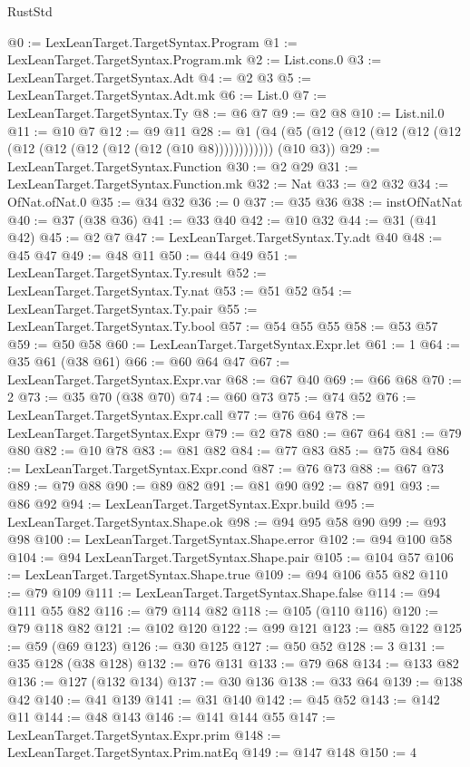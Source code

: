 \begin{lexlean}{RustStd}
\begin{coremodule}
@0 := LexLeanTarget.TargetSyntax.Program
@1 := LexLeanTarget.TargetSyntax.Program.mk
@2 := List.cons.{0}
@3 := LexLeanTarget.TargetSyntax.Adt
@4 := @2 @3
@5 := LexLeanTarget.TargetSyntax.Adt.mk
@6 := List.{0}
@7 := LexLeanTarget.TargetSyntax.Ty
@8 := @6 @7
@9 := @2 @8
@10 := List.nil.{0}
@11 := @10 @7
@12 := @9 @11
@28 := @1 (@4 (@5 (@12 (@12 (@12 (@12 (@12 (@12 (@12 (@12 (@12 (@12 (@10 @8)))))))))))) (@10 @3))
@29 := LexLeanTarget.TargetSyntax.Function
@30 := @2 @29
@31 := LexLeanTarget.TargetSyntax.Function.mk
@32 := Nat
@33 := @2 @32
@34 := OfNat.ofNat.{0}
@35 := @34 @32
@36 := 0
@37 := @35 @36
@38 := instOfNatNat
@40 := @37 (@38 @36)
@41 := @33 @40
@42 := @10 @32
@44 := @31 (@41 @42)
@45 := @2 @7
@47 := LexLeanTarget.TargetSyntax.Ty.adt @40
@48 := @45 @47
@49 := @48 @11
@50 := @44 @49
@51 := LexLeanTarget.TargetSyntax.Ty.result
@52 := LexLeanTarget.TargetSyntax.Ty.nat
@53 := @51 @52
@54 := LexLeanTarget.TargetSyntax.Ty.pair
@55 := LexLeanTarget.TargetSyntax.Ty.bool
@57 := @54 @55 @55
@58 := @53 @57
@59 := @50 @58
@60 := LexLeanTarget.TargetSyntax.Expr.let
@61 := 1
@64 := @35 @61 (@38 @61)
@66 := @60 @64 @47
@67 := LexLeanTarget.TargetSyntax.Expr.var
@68 := @67 @40
@69 := @66 @68
@70 := 2
@73 := @35 @70 (@38 @70)
@74 := @60 @73
@75 := @74 @52
@76 := LexLeanTarget.TargetSyntax.Expr.call
@77 := @76 @64
@78 := LexLeanTarget.TargetSyntax.Expr
@79 := @2 @78
@80 := @67 @64
@81 := @79 @80
@82 := @10 @78
@83 := @81 @82
@84 := @77 @83
@85 := @75 @84
@86 := LexLeanTarget.TargetSyntax.Expr.cond
@87 := @76 @73
@88 := @67 @73
@89 := @79 @88
@90 := @89 @82
@91 := @81 @90
@92 := @87 @91
@93 := @86 @92
@94 := LexLeanTarget.TargetSyntax.Expr.build
@95 := LexLeanTarget.TargetSyntax.Shape.ok
@98 := @94 @95 @58 @90
@99 := @93 @98
@100 := LexLeanTarget.TargetSyntax.Shape.error
@102 := @94 @100 @58
@104 := @94 LexLeanTarget.TargetSyntax.Shape.pair
@105 := @104 @57
@106 := LexLeanTarget.TargetSyntax.Shape.true
@109 := @94 @106 @55 @82
@110 := @79 @109
@111 := LexLeanTarget.TargetSyntax.Shape.false
@114 := @94 @111 @55 @82
@116 := @79 @114 @82
@118 := @105 (@110 @116)
@120 := @79 @118 @82
@121 := @102 @120
@122 := @99 @121
@123 := @85 @122
@125 := @59 (@69 @123)
@126 := @30 @125
@127 := @50 @52
@128 := 3
@131 := @35 @128 (@38 @128)
@132 := @76 @131
@133 := @79 @68
@134 := @133 @82
@136 := @127 (@132 @134)
@137 := @30 @136
@138 := @33 @64
@139 := @138 @42
@140 := @41 @139
@141 := @31 @140
@142 := @45 @52
@143 := @142 @11
@144 := @48 @143
@146 := @141 @144 @55
@147 := LexLeanTarget.TargetSyntax.Expr.prim
@148 := LexLeanTarget.TargetSyntax.Prim.natEq
@149 := @147 @148
@150 := 4

\end{coremodule}
\end{lexlean}
